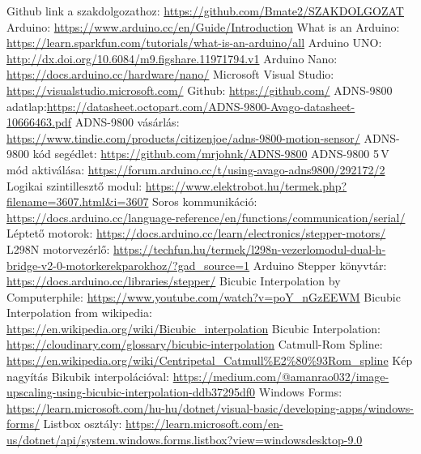 \documentclass[]{thesis-ekf}
\theoremstyle{definition}
\theoremstyle{remark}
\begin{document}
\begin{thebibliography}{9}
 Github link a szakdolgozathoz: \url{https://github.com/Bmate2/SZAKDOLGOZAT}
 Arduino: \url{https://www.arduino.cc/en/Guide/Introduction}
 What is an Arduino: \url{https://learn.sparkfun.com/tutorials/what-is-an-arduino/all}
 Arduino UNO: \url{http://dx.doi.org/10.6084/m9.figshare.11971794.v1}
 Arduino Nano: \url{https://docs.arduino.cc/hardware/nano/}
 Microsoft Visual Studio: \url{https://visualstudio.microsoft.com/}
 Github: \url{https://github.com/}
 ADNS-9800 adatlap:\url{https://datasheet.octopart.com/ADNS-9800-Avago-datasheet-10666463.pdf}
 ADNS-9800 vásárlás: \url{https://www.tindie.com/products/citizenjoe/adns-9800-motion-sensor/}
 ADNS-9800 kód segédlet: \url{https://github.com/mrjohnk/ADNS-9800}
 ADNS-9800 5\,V mód aktiválása: \url{https://forum.arduino.cc/t/using-avago-adns9800/292172/2}
 Logikai szintillesztő modul: \url{https://www.elektrobot.hu/termek.php?filename=3607.html&i=3607}
 Soros kommunikáció: \url{https://docs.arduino.cc/language-reference/en/functions/communication/serial/}
 Léptető motorok: \url{https://docs.arduino.cc/learn/electronics/stepper-motors/}
 L298N motorvezérlő: \url{https://techfun.hu/termek/l298n-vezerlomodul-dual-h-bridge-v2-0-motorkerekparokhoz/?gad_source=1}
 Arduino Stepper könyvtár: \url{https://docs.arduino.cc/libraries/stepper/}
 Bicubic Interpolation by Computerphile: \url{https://www.youtube.com/watch?v=poY_nGzEEWM}
 Bicubic Interpolation from wikipedia: \url{https://en.wikipedia.org/wiki/Bicubic_interpolation}
 Bicubic Interpolation: \url{https://cloudinary.com/glossary/bicubic-interpolation}
 Catmull-Rom Spline: \url{https://en.wikipedia.org/wiki/Centripetal_Catmull%E2%80%93Rom_spline}
 Kép nagyítás Bikubik interpolációval: \url{https://medium.com/@amanrao032/image-upscaling-using-bicubic-interpolation-ddb37295df0}
 Windows Forms: \url{https://learn.microsoft.com/hu-hu/dotnet/visual-basic/developing-apps/windows-forms/}
 Listbox osztály: \url{https://learn.microsoft.com/en-us/dotnet/api/system.windows.forms.listbox?view=windowsdesktop-9.0}

\end{thebibliography}
\end{document}
